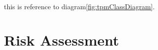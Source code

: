 \FloatBarrier

this is reference to diagram\ref{fig:tpmClassDiagram}.







\section{Risk Assessment}






